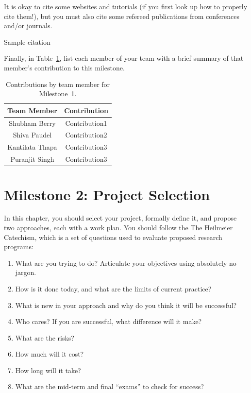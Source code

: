 \documentclass{report}
\begin{document}
It is okay to cite some websites and tutorials (if you first look up how to properly cite them!), but you must also cite some refereed publications from conferences and/or journals.

Sample citation

Finally, in Table~\ref{tab:contribution1}, list each member of your team with a brief summary of that member's contribution to this milestone.

\begin{table}[h]
    \caption{Contributions by team member for Milestone~1.}
    \centering
    \begin{tabular}{|c|c|} \hline
    {\bf Team Member}     &  {\bf Contribution}  \\ \hline
    Shubham Berry     &  Contribution1 \\
    Shiva Paudel    &  Contribution2 \\
    Kantilata Thapa     &  Contribution3 \\ 
    Puranjit Singh     &  Contribution3 \\ \hline
    \end{tabular}
    \label{tab:contribution1}
\end{table}
\fi

\chapter{Milestone 2: Project Selection}
\iffalse
In this chapter, you should select your project, formally define it, and propose two approaches, each with a work plan.  You should follow the The Heilmeier Catechism, which is a set of questions used to evaluate proposed research programs:  
\begin{enumerate}
    \item What are you trying to do? Articulate your objectives using absolutely no jargon.
   \item How is it done today, and what are the limits of current practice?
   \item What is new in your approach and why do you think it will be successful?
   \item Who cares? If you are successful, what difference will it make?
   \item What are the risks?
   \item How much will it cost?
   \item How long will it take?
   \item What are the mid-term and final ``exams'' to check for success?
\end{enumerate}
\end{document}
